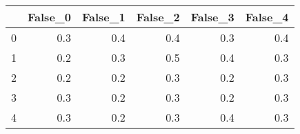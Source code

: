 \begin{tabular}{lrrrrr}
\toprule
{} &  False\_0 &  False\_1 &  False\_2 &  False\_3 &  False\_4 \\ \hline
\midrule
0 &      0.3 &      0.4 &      0.4 &      0.3 &      0.4 \\ \hline
1 &      0.2 &      0.3 &      0.5 &      0.4 &      0.3 \\ \hline
2 &      0.2 &      0.2 &      0.3 &      0.2 &      0.3 \\ \hline
3 &      0.3 &      0.2 &      0.3 &      0.2 &      0.3 \\ \hline
4 &      0.3 &      0.2 &      0.3 &      0.4 &      0.3 \\ \hline
\bottomrule
\end{tabular}
